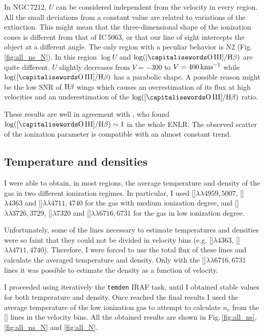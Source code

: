 \documentclass[../main.tex]{subfiles}
\begin{document}
In NGC\,7212, $U$ can be considered independent from the velocity in every region.
All the small deviations from a constant value are related to variations of the extinction.
This might mean that the three-dimensional shape of the ionization cones is different from that of IC\,5063, or that our line of sight intercepts the object at a different angle.
The only region with a peculiar behavior is N2 (Fig.\,\ref{fig:all_ns_N}).
In this region $\log U$ and $\log([\rm\ion{O}{III}]/\Hb)$ are quite different.
$U$ slightly decreases from $V=-300$ to $V= 400\,\si{\kms}$ while $\log([\rm\ion{O}{III}]/\Hb)$ has a parabolic shape.
A possible reason might be the low SNR of $\Hb$ wings which causes an overestimation of its flux at high velocities and an underestimation of the $\log([\rm\ion{O}{III}]/\Hb)$ ratio.

These results are well in agreement with \citet{Cracco11}, who found $\log([\rm\ion{O}{III}]/\Hb)\sim1$ in the whole ENLR.
The observed scatter of the ionization parameter is compatible with an almost constant trend.



\subsection{Temperature and densities}

I were able to obtain, in most regions, the average temperature and density of the gas in two different ionization regimes.
In particular, I used []$\lambda\lambda4959,5007$, []$\lambda4363$ and  []$\lambda\lambda4711,4740$ for the gas with medium ionization degree, and []$\lambda\lambda3726,3729$, []$\lambda7320$ and  []$\lambda\lambda6716,6731$ for the gas in low ionization degree.

Unfortunately, some of the lines necessary to estimate temperatures and densities were so faint that they could not be divided in velocity bins (e.g. []$\lambda4363$, []$\lambda\lambda4711,4740$).
Therefore, I were forced to use the total flux of these lines and calculate the averaged temperature and density.
Only with the []$\lambda\lambda6716,6731$ lines it was possible to estimate the density as a function of velocity. 

I proceeded using iteratively the \verb!temden! IRAF task, until I obtained stable values for both temperature and density.
Once reached the final results I used the average temperature of the low ionization gas to attempt to calculate $n_e$ from the [] lines in the velocity bins.
All the obtained results are shown in Fig.\,\ref{fig:all_ns}, \ref{fig:all_ns_N} and \ref{fig:all_N}.
\end{document}
